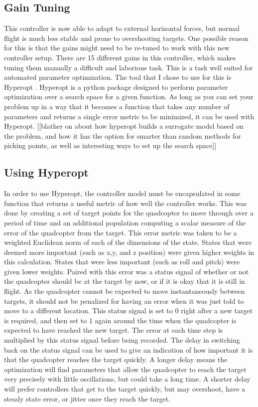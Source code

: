 \documentclass[letterpaper,12pt,titlepage,oneside,final]{book}
\begin{document}
\subsection{Gain Tuning}

This controller is now able to adapt to external horizontal forces, but normal flight is much less stable and prone to overshooting targets. 
One possible reason for this is that the gains might need to be re-tuned to work with this new controller setup. 
There are 15 different gains in this controller, which makes tuning them manually a difficult and laborious task.
This is a task well suited for automated parameter optimization. 
The tool that I chose to use for this is Hyperopt \cite{bergstra2013hyperopt}. 
Hyperopt is a python package designed to perform parameter optimization over a search space for a given function. 
As long as you can set your problem up in a way that it becomes a function that takes any number of parameters and returns a single error metric to be minimized, it can be used with Hyperopt. [[blather on about how hyperopt builds a surrogate model based on the problem, and how it has the option for smarter than random methods for picking points, as well as interesting ways to set up the search space]]

\subsection{Using Hyperopt}

In order to use Hyperopt, the controller model must be encapsulated in some function that returns a useful metric of how well the controller works. This was done by creating a set of target points for the quadcopter to move through over a period of time and an additional population computing a scalar measure of the error of the quadcopter from the target. This error metric was taken to be a weighted Euclidean norm of each of the dimensions of the state. States that were deemed more important (such as x,y, and z position) were given higher weights in this calculation. States that were less important (such as roll and pitch) were given lower weights. 
Paired with this error was a status signal of whether or not the quadcopter should be at the target by now, or if it is okay that it is still in flight. 
As the quadcopter cannot be expected to move instantaneously between targets, it should not be penalized for having an error when it was just told to move to a different location. 
This status signal is set to 0 right after a new target is required, and then set to 1 again around the time when the quadcopter is expected to have reached the new target. The error at each time step is multiplied by this status signal before being recorded. 
The delay in switching back on the status signal can be used to give an indication of how important it is that the quadcopter reaches the target quickly. 
A longer delay means the optimization will find parameters that allow the quadcopter to reach the target very precisely with little oscillations, but could take a long time. 
A shorter delay will prefer controllers that get to the target quickly, but may overshoot, have a steady state error, or jitter once they reach the target.
\end{document}
